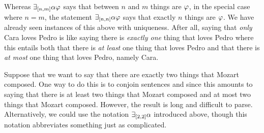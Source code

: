 Whereas $\exists_{[n,m]} \alpha\varphi$ says that between $n$ and $m$ things are $\varphi$, in the special case where $n=m$, the statement $\exists_{[n,n]} \alpha\varphi$ says that exactly $n$ things are $\varphi$. 
We have already seen instances of this above with uniqueness.
After all, saying that \textit{only} Cara loves Pedro is like saying there is \textit{exactly one} thing that loves Pedro where this entails both that there is \textit{at least} one thing that loves Pedro and that there is \textit{at most} one thing that loves Pedro, namely Cara.

Suppose that we want to say that there are exactly two things that Mozart composed.
One way to do this is to conjoin sentences  and  since this amounts to saying that there is at least two things that Mozart composed and at most two things that Mozart composed. 
However, the result is long and difficult to parse.
Alternatively, we could use the notation $\exists_{[2,2]} \alpha$ introduced above, though this notation abbreviates something just as complicated.

